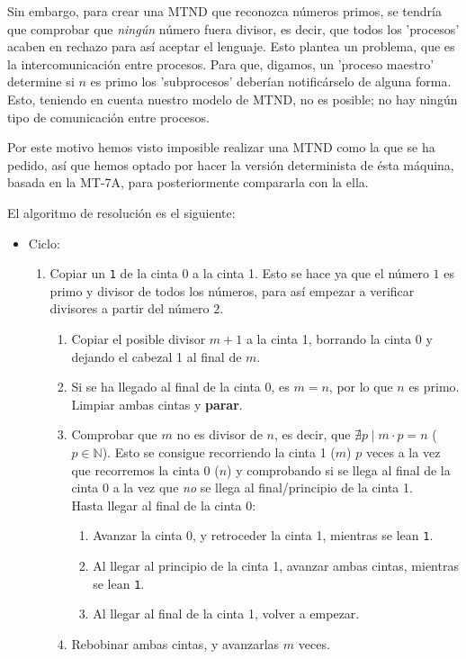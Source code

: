 Sin embargo, para crear una MTND que reconozca números primos, se tendría que comprobar que \textit{ningún} número fuera divisor, es decir, que todos los 'procesos' acaben en rechazo para así aceptar el lenguaje. Esto plantea un problema, que es la intercomunicación entre procesos. Para que, digamos, un 'proceso maestro' determine si $n$ es primo los 'subprocesos' deberían notificárselo de alguna forma.\\
Esto, teniendo en cuenta nuestro modelo de MTND, no es posible; no hay ningún tipo de comunicación entre procesos.\medskip

Por este motivo hemos visto imposible realizar una MTND como la que se ha pedido, así que hemos optado por hacer la versión determinista de ésta máquina, basada en la MT-7A, para posteriormente compararla con la ella.\bigskip

El algoritmo de resolución es el siguiente:
\begin{itemize}
    \item Ciclo:
    \begin{enumerate}
        \item Copiar un \texttt{1} de la cinta 0 a la cinta 1. Esto se hace ya que el número $1$ es primo y divisor de todos los números, para así empezar a verificar divisores a partir del número $2$.
        \begin{enumerate}
            \item Copiar el posible divisor $m+1$ a la cinta 1, borrando la cinta 0 y dejando el cabezal 1 al final de $m$.
            \item Si se ha llegado al final de la cinta 0, es $m=n$, por lo que $n$ es primo. Limpiar ambas cintas y \textbf{parar}.
            \item Comprobar que $m$ no es divisor de $n$, es decir, que $\nexists p \mid m\cdot p = n$ ($p \in \mathbb{N}$). Esto se consigue recorriendo la cinta 1 ($m$) $p$ veces a la vez que recorremos la cinta 0 ($n$) y comprobando si se llega al final de la cinta 0 a la vez que \textit{no} se llega al final/principio de la cinta 1.\\
            Hasta llegar al final de la cinta 0:
            \begin{enumerate}[1.]
                \item Avanzar la cinta 0, y retroceder la cinta 1, mientras se lean \texttt{1}.
                \item Al llegar al principio de la cinta 1, avanzar ambas cintas, mientras se lean \texttt{1}.
                \item Al llegar al final de la cinta 1, volver a empezar.
            \end{enumerate}
            \item Rebobinar ambas cintas, y avanzarlas $m$ veces.
        \end{enumerate}
    \end{enumerate}
\end{itemize}

